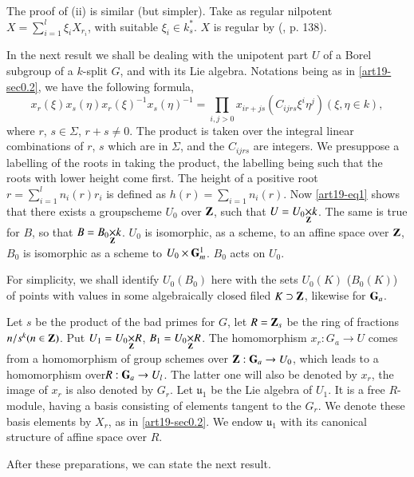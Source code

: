 The proof of (ii) is similar (but simpler). Take as regular nilpotent $X=\sum\limits^{l}_{i=1}\xi_{i}X_{r_{i}}$, with suitable $\xi_{i}\in k^{*}_{s}$. $X$ is regular by (\cite{art19-key14}, p. 138).

In the next result we shall be dealing with the unipotent part $U$ of a Borel subgroup of a $k$-split $G$, and with its Lie algebra. Notations being as in \ref{art19-sec0.2}, we have the following formula,
\begin{equation}
x_{r}(\xi)x_{s}(\eta)x_{r}(\xi)^{-1}x_{s}(\eta)^{-1}=\prod\limits_{i,j>0}x_{ir+js}(C_{ijrs}\xi^{i}\eta^{j})(\xi,\eta\in k),\label{art19-eq1}
\end{equation}
where $r$, $s\in \Sigma$, $r+s\neq 0$. The product is taken over the integral linear combinations of $r$, $s$ which are in $\Sigma$, and the $C_{ijrs}$ are integers. We presuppose a labelling of the roots in taking the product, the labelling being such that the roots with lower height come first. The height of a positive root $r=\sum\limits^{l}_{i=1}n_{i}(r)r_{i}$ is defined as $h(r)=\sum\limits_{i=1}n_{i}(r)$. Now \eqref{art19-eq1} shows that there exists a groupscheme $U_{0}$ over $\mathbf{Z}$, such that $U=\fprod{U_{0}}{k}{\bfZ}$. The same is true for $B$, so that $B=\fprod{B_{0}}{k}{\bfZ}$. $U_{0}$ is isomorphic, as a scheme, to an affine space over $\mathbf{Z}$, $B_{0}$ is isomorphic as a scheme to $U_{0}\times \mathbf{G}^{1}_{m}$. $B_{0}$ acts on $U_{0}$.

For simplicity, we shall identify $U_{0}(B_{0})$ here with the sets $U_{0}(K)$ ($B_{0}(K)$) of points with values in some algebraically closed filed $K\supset \mathbf{Z}$, likewise for $\mathbf{G}_{a}$.

Let $s$ be the product of the bad primes for $G$, let $R=\mathbf{Z}_{s}$ be the ring of fractions $n/s^{k}(n\in \mathbf{Z})$. Put $U_{1}=\fprod{U_{0}}{R}{\bfZ}$, $B_{1}=\fprod{U_{0}}{R}{\bfZ}$. The homomorphism $x_{r}:G_{a}\to U$ comes from a homomorphism of group schemes over $\mathbf{Z}:\mathbf{G}_{a}\to U_{0}$, which leads to a homomorphism over\pageoriginale $R:\mathbf{G}_{a}\to U_{l}$. The latter one will also be denoted by $x_{r}$, the image of $x_{r}$ is also denoted by $G_{r}$. Let $\mathfrak{u}_{1}$ be the Lie algebra of $U_{1}$. It is a free $R$-module, having a basis consisting of elements tangent to the $G_{r}$. We denote these basis elements by $X_{r}$, as in \ref{art19-sec0.2}. We endow $\mathfrak{u}_{1}$ with its canonical structure of affine space over $R$.

After these preparations, we can state the next result.

